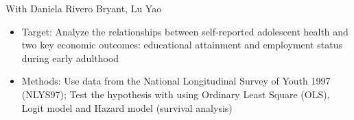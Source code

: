 \documentclass{resume}
\begin{document}
With Daniela Rivero Bryant, Lu Yao
\begin{itemize}
  \item Target: Analyze the relationships between self-reported adolescent health and two key economic outcomes: educational attainment and employment status during early adulthood
  \item Methods: Use data from the National Longitudinal Survey of Youth 1997 (NLYS97); Test the hypothesis with using Ordinary Least Square (OLS), Logit model and Hazard model (survival analysis) 
  \end{itemize}
  

\end{document}

